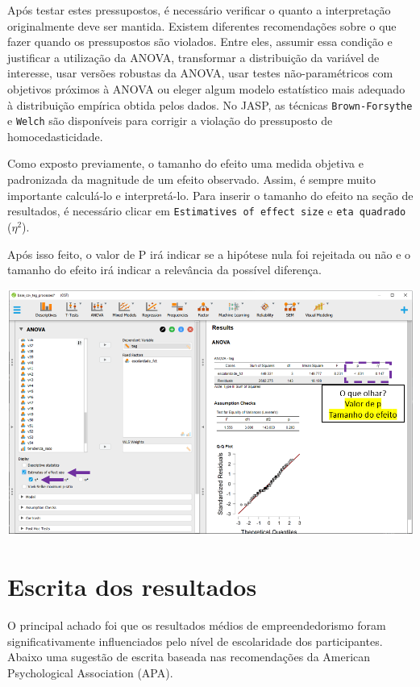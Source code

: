 \documentclass[
]{book}
\begin{document}
Após testar estes pressupostos, é necessário verificar o quanto a interpretação originalmente deve ser mantida. Existem diferentes recomendações sobre o que fazer quando os pressupostos são violados. Entre eles, assumir essa condição e justificar a utilização da ANOVA, transformar a distribuição da variável de interesse, usar versões robustas da ANOVA, usar testes não-paramétricos com objetivos próximos à ANOVA ou eleger algum modelo estatístico mais adequado à distribuição empírica obtida pelos dados. No JASP, as técnicas \texttt{Brown-Forsythe} e \texttt{Welch} são disponíveis para corrigir a violação do pressuposto de homocedasticidade.

Como exposto previamente, o tamanho do efeito uma medida objetiva e padronizada da magnitude de um efeito observado. Assim, é sempre muito importante calculá-lo e interpretá-lo. Para inserir o tamanho do efeito na seção de resultados, é necessário clicar em \texttt{Estimatives\ of\ effect\ size} e \texttt{eta\ quadrado} (\(\eta^2\)).

Após isso feito, o valor de P irá indicar se a hipótese nula foi rejeitada ou não e o tamanho do efeito irá indicar a relevância da possível diferença.

\includegraphics{./img/cap_anova_resultados.png}

\hypertarget{escrita-dos-resultados-4}{%
\section{Escrita dos resultados}\label{escrita-dos-resultados-4}}

O principal achado foi que os resultados médios de empreendedorismo foram significativamente influenciados pelo nível de escolaridade dos participantes. Abaixo uma sugestão de escrita baseada nas recomendações da American Psychological Association (APA).
\end{document}
